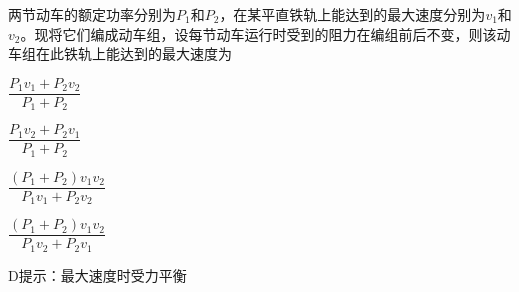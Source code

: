 两节动车的额定功率分别为\(P_1\)和\(P_2\)，在某平直铁轨上能达到的最大速度分别为\(v_1\)和\(v_2\)。现将它们编成动车组，设每节动车运行时受到的阻力在编组前后不变，则该动车组在此铁轨上能达到的最大速度为\paren[]
\begin{choices}
	\item \(\dfrac{P_1v_1 + P_2v_2}{P_1 + P_2}\)
	\item \(\dfrac{P_1v_2 + P_2v_1}{P_1 + P_2}\)
	\item \(\dfrac{(P_1 + P_2)v_1v_2}{P_1v_1 + P_2v_2}\)
	\item \(\dfrac{(P_1 + P_2)v_1v_2}{P_1v_2 + P_2v_1}\)
\end{choices}
\begin{answer}
	D\qquad 提示：最大速度时受力平衡
\end{answer}